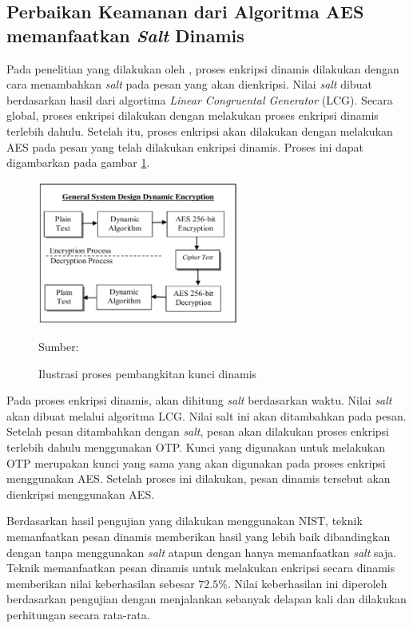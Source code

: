 \subsection{Perbaikan Keamanan dari Algoritma AES memanfaatkan \emph{Salt} Dinamis}
Pada penelitian yang dilakukan oleh \textcite{bachtiar2018}, proses enkripsi dinamis dilakukan dengan cara menambahkan \emph{salt} pada pesan yang akan dienkripsi. Nilai \emph{salt} dibuat berdasarkan hasil dari algortima \emph{Linear Congruental Generator} (LCG). Secara global, proses enkripsi dilakukan dengan melakukan proses enkripsi dinamis terlebih dahulu. Setelah itu, proses enkripsi akan dilakukan dengan melakukan AES pada pesan yang telah dilakukan enkripsi dinamis. Proses ini dapat digambarkan pada gambar \ref{fig:bachtiar.enc.process}.

\begin{figure}[!h]
  \centering
  \includegraphics[width=250px]{chapters/res/chapter-2/img/bachtiar.enc.process.png}
  \caption{Ilustrasi proses pembangkitan kunci dinamis} \label{fig:bachtiar.enc.process}
  Sumber: \textcite{bachtiar2018}
\end{figure}

Pada proses enkripsi dinamis, akan dihitung \emph{salt} berdasarkan waktu. Nilai \emph{salt} akan dibuat melalui algoritma LCG.  Nilai salt ini akan ditambahkan pada pesan. Setelah pesan ditambahkan dengan \emph{salt}, pesan akan dilakukan proses enkripsi terlebih dahulu menggunakan OTP. Kunci yang digunakan untuk melakukan OTP merupakan kunci yang sama yang akan digunakan pada proses enkripsi menggunakan AES. Setelah proses ini dilakukan, pesan dinamis tersebut akan dienkripsi menggunakan AES.

Berdasarkan hasil pengujian yang dilakukan menggunakan NIST, teknik memanfaatkan pesan dinamis memberikan hasil yang lebih baik dibandingkan dengan tanpa menggunakan \emph{salt} atapun dengan hanya memanfaatkan \emph{salt} saja. Teknik memanfaatkan pesan dinamis untuk melakukan enkripsi secara dinamis memberikan nilai keberhasilan sebesar $72.5\%$. Nilai keberhasilan ini diperoleh berdasarkan pengujian dengan menjalankan sebanyak delapan kali dan dilakukan perhitungan secara rata-rata.
